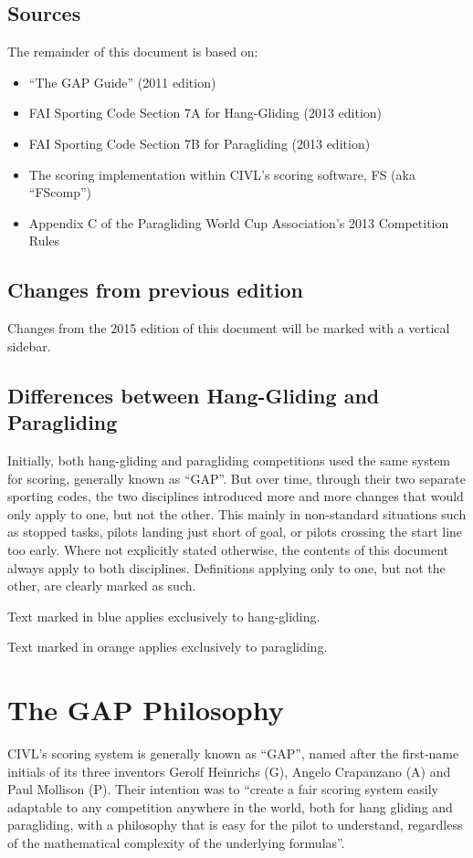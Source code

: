 \documentclass{article}
\begin{document}
\subsection{Sources}
The remainder of this document is based on:
\begin{itemize}
\item “The GAP Guide” (2011 edition)
\item FAI Sporting Code Section 7A for Hang-Gliding (2013 edition)
\item FAI Sporting Code Section 7B for Paragliding (2013 edition)
\item The scoring implementation within CIVL’s scoring software, FS (aka “FScomp”)
\item Appendix C of the Paragliding World Cup Association’s 2013 Competition Rules
\end{itemize}

\subsection{Changes from previous edition}
Changes from the 2015 edition of this document will be marked with a vertical
sidebar.

\subsection{Differences between Hang-Gliding and Paragliding}
Initially, both hang-gliding and paragliding competitions used the same system
for scoring, generally known as “GAP”. But over time, through their two
separate sporting codes, the two disciplines introduced more and more changes
that would only apply to one, but not the other. This mainly in non-standard
situations such as stopped tasks, pilots landing just short of goal, or pilots
crossing the start line too early. Where not explicitly stated otherwise, the
contents of this document always apply to both disciplines. Definitions
applying only to one, but not the other, are clearly marked as such.

Text marked in blue applies exclusively to hang-gliding.

Text marked in orange applies exclusively to paragliding.

\newpage
\section{The GAP Philosophy}
CIVL’s scoring system is generally known as “GAP”, named after the first-name
initials of its three inventors Gerolf Heinrichs (G), Angelo Crapanzano (A) and
Paul Mollison (P). Their intention was to “create a fair scoring system easily
adaptable to any competition anywhere in the world, both for hang gliding and
paragliding, with a philosophy that is easy for the pilot to understand,
regardless of the mathematical complexity of the underlying formulas”.
\end{document}
